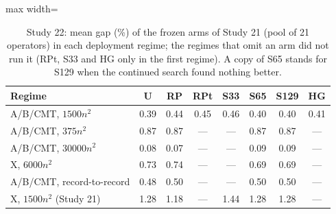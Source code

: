 \begin{table}[t]
\caption{Study 22: mean gap (\%) of the frozen arms of Study 21 (pool of 21 operators) in each deployment regime; the regimes that omit an arm did not run it (RPt, S33 and HG only in the first regime). A copy of S65 stands for S129 when the continued search found nothing better.}\label{tab:s22a}
\centering
\small
\begin{adjustbox}{max width=\linewidth}
\begin{tabular}{lccccccc}
\toprule
Regime & U & RP & RPt & S33 & S65 & S129 & HG \\
\midrule
A/B/CMT, $1500n^2$ & 0.39 & 0.44 & 0.45 & 0.46 & 0.40 & 0.40 & 0.41 \\
A/B/CMT, $375n^2$ & 0.87 & 0.87 & --- & --- & 0.87 & 0.87 & --- \\
A/B/CMT, $30000n^2$ & 0.08 & 0.07 & --- & --- & 0.09 & 0.09 & --- \\
X, $6000n^2$ & 0.73 & 0.74 & --- & --- & 0.69 & 0.69 & --- \\
A/B/CMT, record-to-record & 0.48 & 0.50 & --- & --- & 0.50 & 0.50 & --- \\
X, $1500n^2$ (Study 21) & 1.28 & 1.18 & --- & 1.44 & 1.28 & 1.28 & --- \\
\bottomrule
\end{tabular}
\end{adjustbox}
\end{table}
